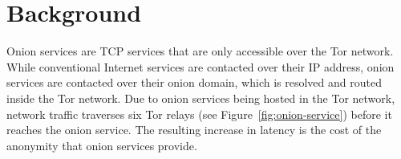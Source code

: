 \section{Background}
\label{sec:background}

Onion services are TCP services that are only accessible over the Tor network.
While conventional Internet services are contacted over their IP address, onion
services are contacted over their onion domain, which is resolved and routed
inside the Tor network.  Due to onion services being hosted in the Tor network,
network traffic traverses six Tor relays (see Figure~\ref{fig:onion-service})
before it reaches the onion service.  The resulting increase in latency is the
cost of the anonymity that onion services provide.

\begin{figure*}[ht]
\centering
{}
\caption{When a user connects to an onion service, there are six relays in
between her Tor Browser (on the left) and the onion service (on the right).}
\label{fig:onion-service}
\end{figure*}

